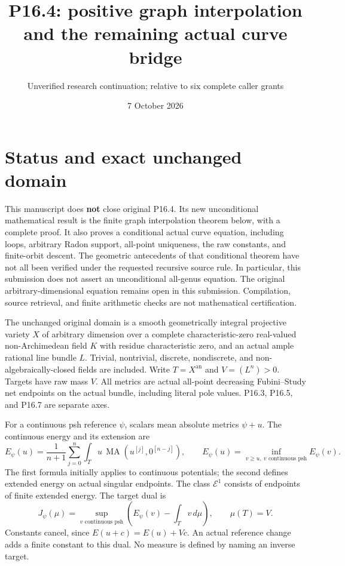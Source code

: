 \documentclass[
  11pt,
]{article}
\title{P16.4: positive graph interpolation and the remaining actual
curve bridge}
\author{Unverified research continuation; relative to six complete
caller grants}
\date{7 October 2026}
\begin{document}
\maketitle

\section{Status and exact unchanged
domain}\label{status-and-exact-unchanged-domain}

This manuscript does \textbf{not} close original P16.4. Its new
unconditional mathematical result is the finite graph interpolation
theorem below, with a complete proof. It also proves a conditional
actual curve equation, including loops, arbitrary Radon support,
all-point uniqueness, the raw constants, and finite-orbit descent. The
geometric antecedents of that conditional theorem have not all been
verified under the requested recursive source rule. In particular, this
submission does not assert an unconditional all-genus equation. The
original arbitrary-dimensional equation remains open in this submission.
Compilation, source retrieval, and finite arithmetic checks are not
mathematical certification.

The unchanged original domain is a smooth geometrically integral
projective variety \(X\) of arbitrary dimension over a complete
characteristic-zero real-valued non-Archimedean field \(K\) with residue
characteristic zero, and an actual ample rational line bundle \(L\).
Trivial, nontrivial, discrete, nondiscrete, and non-algebraically-closed
fields are included. Write \(T=X^{\mathrm{an}}\) and \(V=(L^n)>0\).
Targets have raw mass \(V\). All metrics are actual all-point decreasing
Fubini--Study net endpoints on the actual bundle, including literal pole
values. P16.3, P16.5, and P16.7 are separate axes.

For a continuous psh reference \(\psi\), scalars mean absolute metrics
\(\psi+u\). The continuous energy and its extension are \[
 E_\psi(u)=\frac1{n+1}\sum_{j=0}^n\int_Tu\,\operatorname{MA}(u^{[j]},0^{[n-j]}),\qquad
 E_\psi(u)=\inf_{v\geq u,\ v\text{ continuous psh}}E_\psi(v).
\] The first formula initially applies to continuous potentials; the
second defines extended energy on actual singular endpoints. The class
\(\mathcal E^1\) consists of endpoints of finite extended energy. The
target dual is \[
 J_\psi(\mu)=\sup_{v\text{ continuous psh}}\left(E_\psi(v)-\int_Tv\,d\mu\right),\qquad \mu(T)=V.
\] Constants cancel, since \(E(u+c)=E(u)+Vc\). An actual reference
change adds a finite constant to this dual. No measure is defined by
naming an inverse target.
\end{document}
